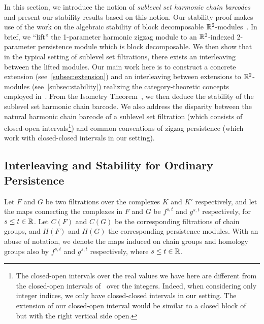 \documentclass[10pt,a4paper]{amsart}
\newcommand {\mm}[1] {\ifmmode{#1}\else{\mbox{\(#1\)}}\fi}
\newcommand{\Rspace}        {\mm{\mathbb{R}}}
\newcommand{\hcb}{{harmonic chain barcode}}
\theoremstyle{definition}
\theoremstyle{remark}
\begin{document}
In this section, we introduce the notion of \emph{sublevel set harmonic chain barcodes} and present our stability results based on this notion.
Our stability proof makes use of the work on the algebraic stability of block decomposable $\Rspace^2$-modules~\cite{bjerkevik2021stability,botnan2018algebraic}. 
In brief, we ``lift'' the 1-parameter harmonic zigzag module to an $\Rspace^2$-indexed 2-parameter persistence module which is block decomposable. 
We then show that in the typical setting of sublevel set filtrations, there exists an interleaving between the lifted modules. Our main work here is to construct a concrete extension (see~\cref{subsec:extension}) and an interleaving between extensions to $\Rspace^2$-modules (see~\cref{subsec:stability}) realizing the category-theoretic concepts employed in~\cite{bjerkevik2021stability,botnan2018algebraic}. From the Isometry Theorem~\cite{bauer2014induced,botnan2018algebraic}, we then deduce the stability of the sublevel set {\hcb}.
We also address the disparity between the natural {\hcb} of a sublevel set filtration (which consists of closed-open intervals\footnote{The closed-open intervals over the real values we have here are different from the closed-open intervals of~\cite{bjerkevik2021stability,botnan2018algebraic} over the integers. Indeed, when considering only integer indices, we only have closed-closed intervals in our setting. The extension of our closed-open interval would be similar to a closed block of~\cite{botnan2018algebraic} but with the right vertical side open.}) and common conventions of zigzag persistence (which work with closed-closed intervals in our setting).  

\subsection{Interleaving and Stability for Ordinary Persistence} \label{subsec:ordinaryinterleaving}


Let $F$ and $G$ be two filtrations over the complexes $K$ and $K'$ respectively, and let the maps connecting the complexes in $F$ and $G$ be $f^{s,t}$ and $g^{s,t}$ respectively, for  $s\leq t \in \Rspace$. Let $C(F)$ and $C(G)$ be the corresponding filtrations of chain groups, and $H(F)$ and $H(G)$ the corresponding persistence modules. With an abuse of notation, we denote the maps induced on chain groups and homology groups also by $f^{s,t}$ and $g^{s,t}$ respectively, where $s\leq t \in \Rspace$.
\end{document}
